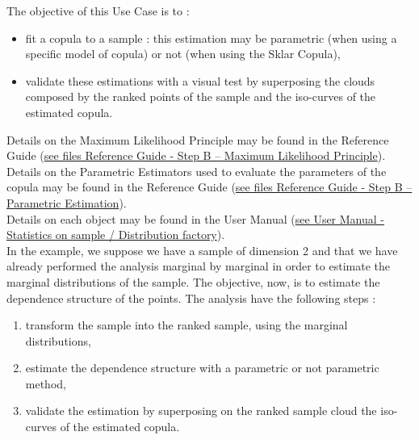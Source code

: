 \renewcommand{\filename}{docUC_InputNoData_CopulaEstimation.tex}
\renewcommand{\filetitle}{UC : Estimating a Copula from a sample}

\HeaderIIILevel


\label{copula_estimation}





The objective of this Use Case is to :
\begin{itemize}
\item fit a copula to a sample : this estimation may be parametric (when using a specific model of copula) or not (when using the Sklar Copula),
\item validate these estimations with a visual test by superposing the clouds composed by the ranked points of the sample and the iso-curves of the estimated copula.
\end{itemize}


Details on the Maximum Likelihood  Principle may be found in the Reference Guide (\href{OpenTURNS_ReferenceGuide.pdf}{see files Reference Guide - Step B -- Maximum Likelihood  Principle}).\\

Details on the Parametric Estimators used to evaluate the parameters of the copula may be found in the Reference Guide (\href{OpenTURNS_ReferenceGuide.pdf}{see files Reference Guide - Step B --  Parametric Estimation}).\\

Details on each object may be found in the User Manual  (\href{OpenTURNS_UserManual_TUI.pdf}{see User Manual - Statistics on sample /  Distribution factory}).\\


In the example, we suppose we have a sample of dimension 2 and that we have already performed the analysis marginal by marginal in order to estimate the marginal distributions of the sample. The objective, now, is to estimate the dependence structure of the points. The analysis  have the following steps :
\begin{enumerate}
\item transform the sample into the ranked sample, using the marginal distributions,
\item estimate the dependence structure with a parametric or not parametric method,
\item validate the estimation by superposing on the ranked sample cloud the iso-curves of the estimated copula.
\end{enumerate}


